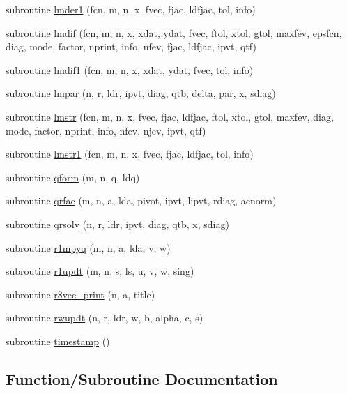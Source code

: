 \begin{DoxyCompactItemize}
subroutine \hyperlink{minpack_8f95_ab4dbf9a20a957dfb72d70219dd6ad6d4}{lmder1} (fcn, m, n, x, fvec, fjac, ldfjac, tol, info)
\item 
subroutine \hyperlink{minpack_8f95_a4689c4ce455cf0795081e88c004b48ff}{lmdif} (fcn, m, n, x, xdat, ydat, fvec, ftol, xtol, gtol, maxfev, epsfcn, diag, mode, factor, nprint, info, nfev, fjac, ldfjac, ipvt, qtf)
\item 
subroutine \hyperlink{minpack_8f95_a700bf6f1bdcace537df37252fd26c723}{lmdif1} (fcn, m, n, x, xdat, ydat, fvec, tol, info)
\item 
subroutine \hyperlink{minpack_8f95_a1dc1e9adda30350383f28f6cc6361365}{lmpar} (n, r, ldr, ipvt, diag, qtb, delta, par, x, sdiag)
\item 
subroutine \hyperlink{minpack_8f95_a178ff688f77b7192504790b6741ecd4d}{lmstr} (fcn, m, n, x, fvec, fjac, ldfjac, ftol, xtol, gtol, maxfev, diag, mode, factor, nprint, info, nfev, njev, ipvt, qtf)
\item 
subroutine \hyperlink{minpack_8f95_acee42ee803b3870261fa529dc123a892}{lmstr1} (fcn, m, n, x, fvec, fjac, ldfjac, tol, info)
\item 
subroutine \hyperlink{minpack_8f95_a12e8db1e181463d5c3af21f2b1b6b5a7}{qform} (m, n, q, ldq)
\item 
subroutine \hyperlink{minpack_8f95_a64d35f73f2a85378c24dd7b99ddb0c0f}{qrfac} (m, n, a, lda, pivot, ipvt, lipvt, rdiag, acnorm)
\item 
subroutine \hyperlink{minpack_8f95_a0dd208e826a2526722a40eab1724ac83}{qrsolv} (n, r, ldr, ipvt, diag, qtb, x, sdiag)
\item 
subroutine \hyperlink{minpack_8f95_ab7f6e61d92cfd9ea516435ad523b989b}{r1mpyq} (m, n, a, lda, v, w)
\item 
subroutine \hyperlink{minpack_8f95_a8ff726029b3ff9037b390910744ee58b}{r1updt} (m, n, s, ls, u, v, w, sing)
\item 
subroutine \hyperlink{minpack_8f95_adc196cc5030b2eb1660c061fd85bfe0a}{r8vec\+\_\+print} (n, a, title)
\item 
subroutine \hyperlink{minpack_8f95_adbcfef20d552d8c5e7dc5925c975eb23}{rwupdt} (n, r, ldr, w, b, alpha, c, s)
\item 
subroutine \hyperlink{minpack_8f95_a44fdaa08281ed3009542bc9257fa965d}{timestamp} ()
\end{DoxyCompactItemize}


\subsection{Function/\+Subroutine Documentation}
\mbox{\label{minpack_8f95_a0850d60ecd544bc0acd3fc391ff375ac}} 
